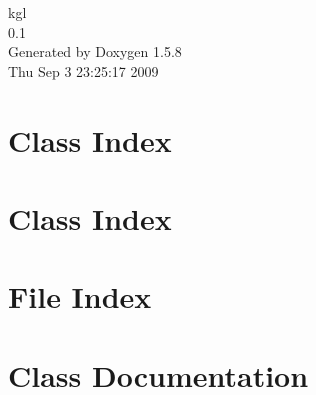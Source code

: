 \documentclass[a4paper]{book}
\begin{document}
\begin{titlepage}
\vspace*{7cm}
\begin{center}
{\Large kgl \\[1ex]\large 0.1 }\\
\vspace*{1cm}
{\large Generated by Doxygen 1.5.8}\\
\vspace*{0.5cm}
{\small Thu Sep 3 23:25:17 2009}\\
\end{center}
\end{titlepage}
\clearemptydoublepage
{}
\tableofcontents
\clearemptydoublepage
{}
\chapter{Class Index}

\chapter{Class Index}

\chapter{File Index}

\chapter{Class Documentation}
































\end{document}
